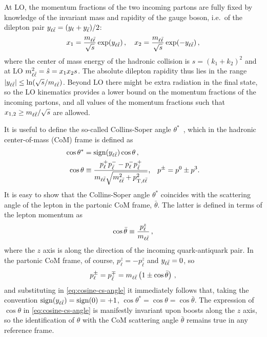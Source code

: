 At LO, the momentum fractions of the two incoming partons are fully
fixed by knowledge of the invariant mass and rapidity of the gauge
boson, i.e.\ of the dilepton pair  $y_{\ell\bar{\ell}} = (y_\ell + y_{\bar{\ell}})/2$: 
\begin{equation}
  \label{eq:x_fractions}
  x_1 = \frac{ m_{\ell\bar{\ell}}}{\sqrt{s}}\exp(y_{\ell\bar{\ell}}) \, ,\quad x_2 = \frac{
  m_{\ell\bar{\ell}}}{\sqrt{s}}\exp(-y_{\ell\bar{\ell}}) \, ,
\end{equation}
where the center of mass energy of the hadronic collision is
$s=(k_1+k_2)^2$ and at LO
$m_{\ell\bar{\ell}}^2 = \hat s = x_1 x_2 s$. The absolute dilepton
rapidity thus lies in the range $|y_{\ell\bar{\ell}}|\le \ln (\sqrt{s}/m_{\ell\bar{\ell}})$.
Beyond LO there might be extra radiation in the final state, so the LO
kinematics provides a lower bound on the momentum fractions of the
incoming partons, and all values of the momentum
fractions such that $x_{1,2}\ge m_{\ell\bar{\ell}}/\sqrt s$ are allowed.

It is useful to define the so-called  Collins-Soper
angle $\theta^*$~\cite{Collins:1977iv}, which in the hadronic center-of-mass
(CoM) frame is defined as
\begin{equation}
\begin{split}
  \cos\theta^* &= \operatorname{sign} (y_{\ell\bar{\ell}}) \cos\theta \, ,\\
  \cos\theta &\equiv\frac{p_\ell^+ p_{\bar{\ell}}^- - p_\ell^- p_{\bar{\ell}}^+}{m_{\ell\bar{\ell}} \sqrt{m_{\ell\bar{\ell}}^2 + p_{\mathrm{T},\ell\bar{\ell}}^2}} \text{,} \quad p^\pm = p^0 \pm p^3 \text{.}
  \label{eq:cosine-cs-angle}
\end{split}
\end{equation}
It is easy to show that the Collins-Soper angle $\theta^*$ coincides with the
scattering angle of the lepton in the partonic CoM frame, $\bar\theta$.
%
The latter is  
defined in terms of the lepton momentum as 
\begin{equation}
 \cos\bar\theta \equiv \frac{p^z_\ell}{m_{\ell\bar{\ell}}} \,, \label{eq:coscm}
\end{equation}
where the $z$ axis is along the direction of the incoming
quark-antiquark pair.
%
In the partonic CoM frame, of course,
$p^z_\ell=-p^z_{\bar \ell}$ and $y_{\ell\bar{\ell}} =0$, so
\begin{equation}
p^\pm_\ell=p^{\mp}_{\bar{\ell}}=  m_{\ell\bar{\ell}} \left( 1\pm \cos{\bar\theta} \right)\, ,
\end{equation}
and substituting in
\cref{eq:cosine-cs-angle} it immediately follows that, taking
the convention 
$\operatorname{sign} (y_{\ell\bar{\ell}})=\operatorname{sign}(0)=+1$, 
$\cos\theta^*=\cos\theta=\cos{\bar\theta}$.
%
The expression of $\cos\theta$ in \cref{eq:cosine-cs-angle} is
manifestly invariant upon boosts along the $z$ axis, so the
identification of $\theta$ with the CoM scattering angle $\bar\theta$
remains true in any reference frame.

